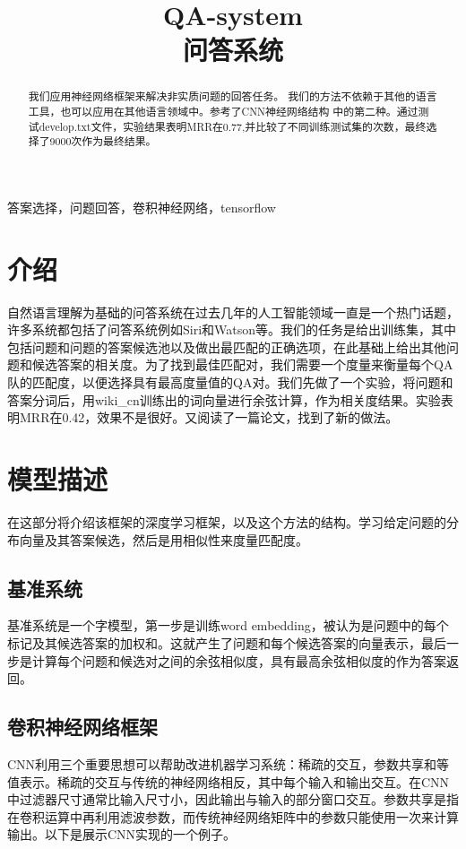 \documentclass{article}
\title{QA-system \\问答系统}
\begin{document}
%
\maketitle
%


\begin{abstract}
我们应用神经网络框架来解决非实质问题的回答任务。
我们的方法不依赖于其他的语言工具，也可以应用在其他语言领域中。参考了CNN神经网络结构 \cite{adlt}中的第二种。通过测试develop.txt文件，实验结果表明MRR在0.77,并比较了不同训练测试集的次数，最终选择了9000次作为最终结果。

\end{abstract}

%
\begin{keywords}
答案选择，问题回答，卷积神经网络，tensorflow
\end{keywords}
%
\section{介绍}
\label{sec:intro}
自然语言理解为基础的问答系统在过去几年的人工智能领域一直是一个热门话题，许多系统都包括了问答系统例如Siri和Watson等。我们的任务是给出训练集，其中包括问题和问题的答案候选池以及做出最匹配的正确选项，在此基础上给出其他问题和候选答案的相关度。为了找到最佳匹配对，我们需要一个度量来衡量每个QA队的匹配度，以便选择具有最高度量值的QA对。我们先做了一个实验，将问题和答案分词后，用wiki\_cn训练出的词向量进行余弦计算，作为相关度结果。实验表明MRR在0.42，效果不是很好。又阅读了一篇论文\cite{adlt}，找到了新的做法。


\section{模型描述}
\label{sec:model}
在这部分将介绍该框架的深度学习框架，以及这个方法的结构。学习给定问题的分布向量及其答案候选，然后是用相似性来度量匹配度。

\subsection{基准系统} 
基准系统是一个字模型，第一步是训练word embedding，被认为是问题中的每个标记及其候选答案的加权和。这就产生了问题和每个候选答案的向量表示，最后一步是计算每个问题和候选对之间的余弦相似度，具有最高余弦相似度的作为答案返回。


\subsection{卷积神经网络框架}
CNN利用三个重要思想可以帮助改进机器学习系统：稀疏的交互，参数共享和等值表示。稀疏的交互与传统的神经网络相反，其中每个输入和输出交互。在CNN中过滤器尺寸通常比输入尺寸小，因此输出与输入的部分窗口交互。参数共享是指在卷积运算中再利用滤波参数，而传统神经网络矩阵中的参数只能使用一次来计算输出。以下是展示CNN实现的一个例子。
\end{document}

